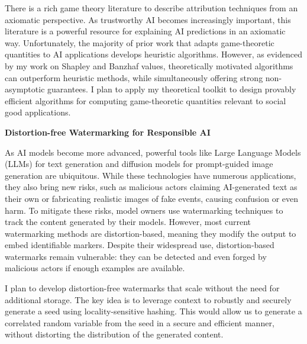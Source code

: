 \documentclass[11pt]{article}
\begin{document}
{There is a rich game theory literature to describe attribution techniques from an axiomatic perspective.
As trustworthy AI becomes increasingly important, this literature is a powerful resource for explaining AI predictions in an axiomatic way.
Unfortunately, the majority of prior work that adapts game-theoretic quantities to AI applications develops heuristic algorithms.
However, as evidenced by my work on Shapley and Banzhaf values, theoretically motivated algorithms can outperform heuristic methods, while simultaneously offering strong non-asymptotic guarantees.
I plan to apply my theoretical toolkit to design provably efficient algorithms for computing game-theoretic quantities relevant to social good applications. 

{\large \textbf{Distortion-free Watermarking for Responsible AI}}

As AI models become more advanced, powerful tools like Large Language Models (LLMs) for text generation and diffusion models for prompt-guided image generation are ubiquitous. While these technologies have numerous applications, they also bring new risks, such as malicious actors claiming AI-generated text as their own or fabricating realistic images of fake events, causing confusion or even harm. To mitigate these risks, model owners use watermarking techniques to track the content generated by their models.
However, most current watermarking methods are distortion-based, meaning they modify the output to embed identifiable markers.
Despite their widespread use, distortion-based watermarks remain vulnerable: they can be detected and even forged by malicious actors if enough examples are available.

I plan to develop distortion-free watermarks that scale without the need for additional storage.
The key idea is to leverage context to robustly and securely generate a seed using locality-sensitive hashing.
This would allow us to generate a correlated random variable from the seed in a secure and efficient manner, without distorting the distribution of the generated content.

}
\end{document}
